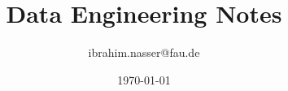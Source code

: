 \usepackage{graphicx}
\usepackage{booktabs}
\usepackage{parskip}
\usepackage{tcolorbox}
\usepackage[fleqn]{amsmath}
\usepackage{multicol}
\usepackage{csquotes}
\usepackage{amsmath}
\usepackage{multicol}
\usepackage{float}
\usepackage{amssymb}
\usepackage{gensymb}
\usepackage[inline]{enumitem}
\usepackage{titling}
\usepackage[margin=0.5in]{geometry}
\usepackage{array}
\usepackage{amsmath}
\usepackage{natbib}
\usepackage[colorlinks=true, linkcolor=blue]{hyperref}
\newcommand{\commandnote}[1]{
    \begin{tcolorbox}[
        standard jigsaw,
        title=Note,
    ]
        #1
    \end{tcolorbox}
}
\newcommand{\minititle}[1]{
\subsubsection*{#1}
}

\newcommand{\mydef}[2]{
    \textbf{#1: }#2
}
\newcommand{\set}[1]{\{#1\}}

\title{Data Engineering Notes}
\author{ibrahim.nasser@fau.de}
\date{\today}
